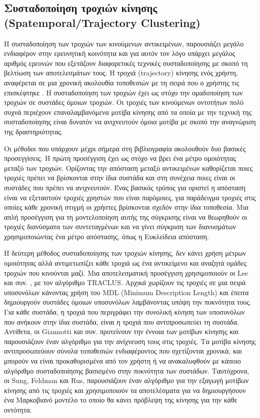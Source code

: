 \documentclass[12pt,twoside,openright]{report}
\begin{document}
\subsection[Συσταδοποίηση τροχιών κίνησης]{Συσταδοποίηση τροχιών κίνησης (\lt Spatemporal/Trajectory Clustering) \gt}
Η συσταδοποίηση των τροχιών των κινούμενων αντικειμένων, παρουσιάζει μεγάλο ενδιαφέρον στην ερευνητική κοινότητα και για αυτόν τον λόγο υπάρχει μεγάλος αριθμός ερευνών που εξετάζουν διαφορετικές τεχνικές συσταδοποίησης με σκοπό τη βελτίωση των αποτελεσμάτων τους. Η τροχιά (trajectory) κίνησης ενός χρήστη, αναφέρεται σε μια χρονική ακολουθία  τοποθεσιών με τη σειρά που ο χρήστης τις επισκέφτηκε \cite{Giannotti:2010}. Η συσταδοποίηση των τροχιών έχει ως στόχο την ομαδοποίηση των τροχιών σε συστάδες όμοιων τροχιών\cite{marketos2009mobility}. Οι τροχιές των κινούμενων οντοτήτων πολύ συχνά περιέχουν επαναλαμβανόμενα μοτίβα κίνησης από τα οποία με την τεχνική της συσταδοποίησης είναι δυνατόν να ανιχνευτούν όμοια μοτίβα με σκοπό την αναγνώριση της δραστηριότητας\cite{SungFR12}. 

Οι μέθοδοι που υπάρχουν μέχρι σήμερα στη βιβλιογραφία ακολουθούν δυο βασικές προσεγγίσεις. Η πρώτη προσέγγιση έχει ως στόχο να βρει ένα μέτρο ομοιότητας μεταξύ των τροχιών. Ορίζοντας την απόσταση μεταξύ αντικειμένων καθορίζεται ποιες τροχιές πρέπει να βρίσκονται στην ίδια συστάδα και στη συνέχεια ποιες είναι οι συστάδες που πρέπει να ανιχνευτούν. Ένας βασικός τρόπος για οριστεί η απόσταση είναι να εξεταστούν τροχιές χρηστών που είναι παρόμοιες, για παράδειγμα τροχιές στις οποίες κάθε χρονική στιγμή οι χρήστες βρίσκονται σχεδόν στην ίδια τοποθεσία. Μια απλή προσέγγιση για τη μοντελοποίηση αυτής της σύγκρισης είναι να θεωρηθούν οι τροχιές διανύσματα των συντεταγμένων και να γίνει σύγκριση των διανυσμάτων χρησιμοποιώντας ένα μέτρο απόστασης, όπως η Ευκλείδεια απόσταση.\cite{giannotti2008mobility}

Η δεύτερη μέθοδος συσταδοποίησης των τροχιών κίνησης, δεν κάνει χρήση μέτρων ομοιότητας αλλά αντιμετωπίζει κάθε τροχιά ως ένα αντικείμενο και αναζητά ομάδες τροχιών που κινούνται μαζί\cite{giannotti2008mobility}. Μια αποτελεσματική προσέγγιση χρησιμοποιούν οι \lt Lee \gt και συν. \cite{Lee:2007}, με τον αλγόριθμο \lt TRACLUS. \gt Αρχικά χωρίζουν τις τροχιές σε μια σειρά υποσυνόλων κάνοντας χρήση του \lt MDL (Minimum Description Length) \gt και έπειτα δημιουργούν συστάδες όμοιων υποσυνόλων λαμβάνοντας υπόψη την πυκνότητα τους. Για κάθε συστάδα, η τροχιά που περιγράφει την συνολική κίνηση των υποσυνόλων που ανήκουν στην ίδια συστάδα, είναι η τροχιά που αντιπροσωπεύει τη συστάδα. Αντίθετα, οι \lt Giannotti \gt και συν. \cite{Giannotti:2010} προτείνουν την έννοια των μοτίβων κίνησης και παρουσιάζουν έναν αλγόριθμο για την ανίχνευση τους στις τροχιές. Τα μοτίβα κίνησης αντιπροσωπεύουν σύνολα τοποθεσιών ενδιαφέροντος που σχετίζονται χρονικά, και μπορούν να είναι προκαθορισμένα από τον χρήστη ή να ανακαλυφθούν με κάποιο αλγόριθμο συσταδοποίησης βασισμένο στην πυκνότητα των συστάδων. Ταυτόχρονα, οι \lt Sung,  Feldman \gt και \lt Rus\gt \cite{SungFR12}, παρουσιάζουν έναν αλγόριθμο για την εξαγωγή μοτίβων κίνησης από τις τροχιές και χρησιμοποιούν τα αποτελέσματα για να δημιουργήσουν ένα Μαρκοβιανό μοντέλο το οποίο θα κάνει πρόβλεψη της κίνησης για την κάθε οντότητα.
\end{document}
